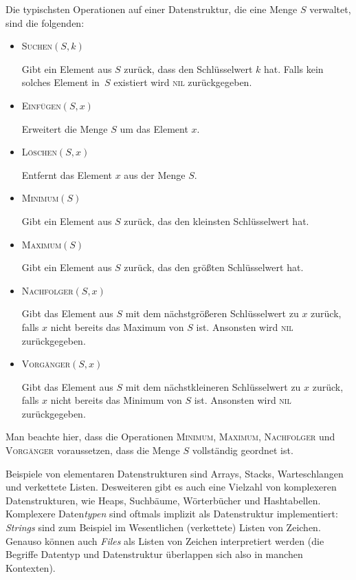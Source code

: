 \begin{bem}
Die typischsten Operationen auf einer Datenstruktur, die eine Menge $S$ verwaltet, sind die folgenden:
%
\begin{itemize}
	\item \textsc{Suchen}$(S,k)$
	
	Gibt ein Element aus $S$ zurück, dass den Schlüsselwert $k$ hat. Falls kein solches Element in~$S$ existiert wird \textsc{nil} zurückgegeben.
	
	\item \textsc{Einfügen}$(S,x)$
	
	Erweitert die Menge $S$ um das Element $x$. 
	
	\item \textsc{Löschen}$(S,x)$
	
	Entfernt das Element $x$ aus der Menge $S$.
	
	\item \textsc{Minimum}$(S)$
	
	Gibt ein Element aus $S$ zurück, das den kleinsten Schlüsselwert hat. 
	
	\item \textsc{Maximum}$(S)$
	
	Gibt ein Element aus $S$ zurück, das den größten Schlüsselwert hat.
	
	\item \textsc{Nachfolger}$(S,x)$
	
	Gibt das Element aus $S$ mit dem nächstgrößeren Schlüsselwert zu $x$ zurück, falls $x$ nicht bereits das Maximum von $S$ ist.
	Ansonsten wird \textsc{nil} zurückgegeben. 
	
	\item \textsc{Vorgänger}$(S,x)$
	
	Gibt das Element aus $S$ mit dem nächstkleineren Schlüsselwert zu $x$ zurück, falls $x$ nicht bereits das Minimum von $S$ ist.
	Ansonsten wird \textsc{nil} zurückgegeben.
	
\end{itemize}

Man beachte hier, dass die Operationen \textsc{Minimum}, \textsc{Maximum}, \textsc{Nachfolger} und \textsc{Vorgänger} voraussetzen, dass die Menge $S$ vollständig geordnet ist. 
\end{bem} 

\begin{bem}
Beispiele von elementaren Datenstrukturen sind Arrays, Stacks, Warteschlangen und verkettete Listen.
Desweiteren gibt es auch eine Vielzahl von komplexeren Datenstrukturen, wie Heaps, Suchbäume, Wörterbücher und Hashtabellen.
Komplexere Daten\emph{typen} sind oftmals implizit als Datenstruktur implementiert: \emph{Strings} sind zum Beispiel im Wesentlichen (verkettete) Listen von Zeichen. Genauso können auch \emph{Files} als Listen von Zeichen interpretiert werden (die Begriffe Datentyp und Datenstruktur überlappen sich also in manchen Kontexten).
\end{bem}

